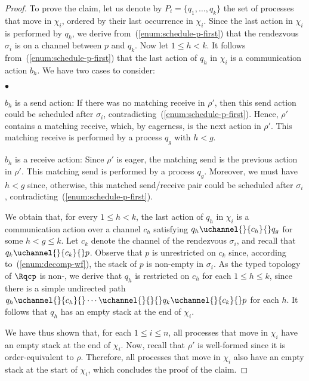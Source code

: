 \documentclass{LMCS}
\begin{document}
\begin{proof}
  To prove the claim, let us denote by $P_i = \{q_1, \ldots, q_k\}$
  the set of processes that move in $\chi_i$, ordered by their last
  occurrence in $\chi_i$. 
  Since the last action in $\chi_i$ is performed by $q_k$, 
  we derive from~(\ref{enum:schedule-p-first}) that the rendezvous
  $\sigma_i$ is on a channel between $p$ and $q_k$. 
  Now let $1 \leq h < k$.  It follows
  from~(\ref{enum:schedule-p-first}) that the last action of $q_h$ in
  $\chi_i$ is a communication action $b_h$.  We have two cases to
  consider: 
  \begin{iteMize}{$\bullet$}
  \item $b_h$ is a send action: If there was no matching receive in $\rho'$, then this send action could be scheduled after $\sigma_i$, contradicting~(\ref{enum:schedule-p-first}).
    Hence, $\rho'$ contains a matching receive, which, by eagerness, is the next action in $\rho'$.
    This matching receive is performed by a process $q_g$ with $h < g$.
  \item $b_h$ is a receive action: Since $\rho'$ is eager, the matching send is the previous action in $\rho'$.
    This matching send is performed by a process $q_g$.
    Moreover, we must have $h < g$ since, otherwise, this matched send/receive pair could be scheduled after $\sigma_i$, contradicting~(\ref{enum:schedule-p-first}).
  \end{iteMize}
  We obtain that, for every $1 \leq h < k$, the last action of $q_h$
  in $\chi_i$ is a communication action over a channel $c_h$
  satisfying $q_h\uchannel{}{c_h}{}q_g$ for some $h < g \le k$.
  Let $c_k$ denote the channel of the rendezvous $\sigma_i$, and recall that $q_k\uchannel{}{c_k}{}p$.
  Observe that $p$ is unrestricted on $c_k$ since, according to~(\ref{enum:decomp-wf}), the stack of $p$ is non-empty in $\sigma_i$.
  As the typed topology of $\Rqcp$ is non-\converging, we derive that
  $q_h$ is restricted on $c_h$ for each $1 \leq h \leq k$, since there
  is a simple undirected path $q_h \uchannel{}{c_h}{} \cdots \uchannel{}{}{} q_k
  \uchannel{}{c_k}{} p$ for each $h$. 
It follows that $q_h$ has an empty stack at the end of $\chi_i$.


  We have thus shown that, for each $1 \leq i \leq n$, all processes
  that move in $\chi_i$ have an empty stack at the end of $\chi_i$.
  Now, recall that $\rho'$ is well-formed since it is order-equivalent
  to $\rho$.  Therefore, all processes that move in $\chi_i$ also have
  an empty stack at the start of $\chi_i$, which concludes the proof
  of the claim.



\end{proof}
\end{document}
